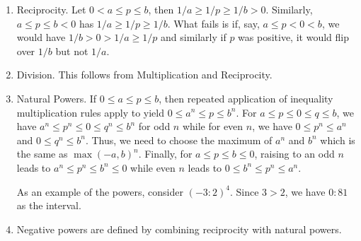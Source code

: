\documentclass[12pt]{article}
\begin{document}
\begin{enumerate}
    \item Reciprocity. Let $0 < a \leq p \leq b$, then $1/a \geq 1/p  \geq 1/b > 0$. Similarly, $a \leq p \leq b< 0$ has $1/a \geq 1/p \geq 1/b$. What fails is if, say,  $a \leq p < 0 < b$, we would have $1/b > 0 > 1/a \geq 1/p $ and similarly if $p$ was positive, it would flip over $1/b$ but not $1/a$.
    \item Division. This follows from Multiplication and Reciprocity. 
    \item\label{natpow} Natural Powers. If $0 \leq a \leq p \leq b$, then repeated application of inequality multiplication rules apply to yield $0 \leq a^n \leq p \leq b^n$. For $a \leq p \leq 0 \leq q \leq b$, we have $a^n \leq p^n \leq 0 \leq q^n \leq b^n$ for odd $n$ while for even $n$, we have $0 \leq p^n \leq a^n$ and $0 \leq q^n \leq b^n$. Thus, we need to choose the maximum of $a^n$ and $b^n$ which is the same as $\max(-a, b)^n$.  Finally, for $a \leq p \leq b \leq 0$, raising to an odd $n$ leads to $a^n \leq p^n \leq b^n \leq  0$ while even $n$ leads to $0 \leq b^n \leq p^n \leq a^n$. 
    

    As an example of the powers, consider $(-3:2)^4$. Since $ 3 > 2$, we have $0:81$ as the interval. 
     
    \item Negative powers are defined by combining reciprocity with natural powers. 
\end{enumerate}
\end{document}
